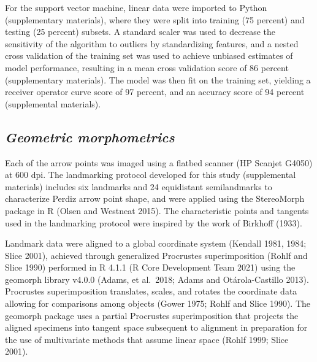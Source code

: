 \documentclass[smallextended]{svjour3}       %
\begin{document}
For the support vector machine, linear data were imported to Python
(supplementary materials), where they were split into training (75
percent) and testing (25 percent) subsets. A standard scaler was used to
decrease the sensitivity of the algorithm to outliers by standardizing
features, and a nested cross validation of the training set was used to
achieve unbiased estimates of model performance, resulting in a mean
cross validation score of 86 percent (supplementary materials). The
model was then fit on the training set, yielding a receiver operator
curve score of 97 percent, and an accuracy score of 94 percent
(supplemental materials).

\hypertarget{geometric-morphometrics}{%
\subsection{\texorpdfstring{\emph{Geometric
morphometrics}}{Geometric morphometrics}}\label{geometric-morphometrics}}

Each of the arrow points was imaged using a flatbed scanner (HP Scanjet
G4050) at 600 dpi. The landmarking protocol developed for this study
(supplemental materials) includes six landmarks and 24 equidistant
semilandmarks to characterize Perdiz arrow point shape, and were applied
using the StereoMorph package in R (Olsen and Westneat 2015). The
characteristic points and tangents used in the landmarking protocol were
inspired by the work of Birkhoff (1933).

Landmark data were aligned to a global coordinate system (Kendall 1981,
1984; Slice 2001), achieved through generalized Procrustes
superimposition (Rohlf and Slice 1990) performed in R 4.1.1 (R Core
Development Team 2021) using the geomorph library v4.0.0 (Adams, et
al.~2018; Adams and Otárola-Castillo 2013). Procrustes superimposition
translates, scales, and rotates the coordinate data allowing for
comparisons among objects (Gower 1975; Rohlf and Slice 1990). The
geomorph package uses a partial Procrustes superimposition that projects
the aligned specimens into tangent space subsequent to alignment in
preparation for the use of multivariate methods that assume linear space
(Rohlf 1999; Slice 2001).
\end{document}
